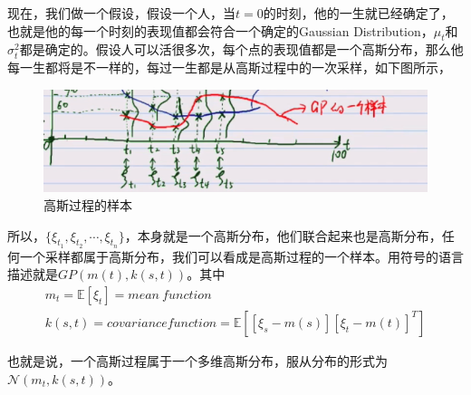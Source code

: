 \documentclass[a4paper]{article}
\begin{document}
现在，我们做一个假设，假设一个人，当$t=0$的时刻，他的一生就已经确定了，也就是他的每一个时刻的表现值都会符合一个确定的Gaussian Distribution，$\mu_t$和$\sigma_t^2$都是确定的。假设人可以活很多次，每个点的表现值都是一个高斯分布，那么他每一生都将是不一样的，每过一生都是从高斯过程中的一次采样，如下图所示，
\begin{figure}[H]
    \centering
    \includegraphics[width=.75\textwidth]{微信图片_20191213130727.png}
    \caption{高斯过程的样本}
\end{figure}

所以，$\{\xi_{t_1},\xi_{t_2},\cdots,\xi_{t_n}\}$，本身就是一个高斯分布，他们联合起来也是高斯分布，任何一个采样都属于高斯分布，我们可以看成是高斯过程的一个样本。{\color{red}用符号的语言描述就是$GP(m(t),k(s,t))$}。其中
\begin{gather}
    m_t = \mathbb{E}[\xi_t] = mean\ function \\
    k(s,t) = covariance function =\mathbb{E}\left[[\xi_s - m(s)][\xi_t - m(t)]^T\right]
\end{gather}

也就是说，一个高斯过程属于一个多维高斯分布，服从分布的形式为$\mathcal{N}(m_t,k(s,t))$。                                                                                                                                              
\end{document}
